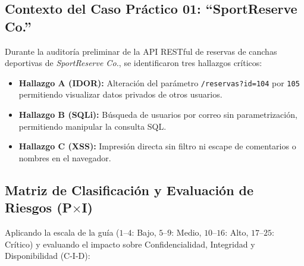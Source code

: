 \documentclass[12pt,a4paper]{article}
\begin{document}
\subsection{Contexto del Caso Práctico 01: ``SportReserve Co.''}
Durante la auditoría preliminar de la API RESTful de reservas de canchas deportivas de \textit{SportReserve Co.}, se identificaron tres hallazgos críticos:
\begin{itemize}
    \item \textbf{Hallazgo A (IDOR):} Alteración del parámetro \texttt{/reservas?id=104} por \texttt{105} permitiendo visualizar datos privados de otros usuarios.
    \item \textbf{Hallazgo B (SQLi):} Búsqueda de usuarios por correo sin parametrización, permitiendo manipular la consulta SQL.
    \item \textbf{Hallazgo C (XSS):} Impresión directa sin filtro ni escape de comentarios o nombres en el navegador.
\end{itemize}

\subsection{Matriz de Clasificación y Evaluación de Riesgos (P$\times$I)}
Aplicando la escala de la guía ($1\text{--}4$: Bajo, $5\text{--}9$: Medio, $10\text{--}16$: Alto, $17\text{--}25$: Crítico) y evaluando el impacto sobre Confidencialidad, Integridad y Disponibilidad (C-I-D):
\end{document}
